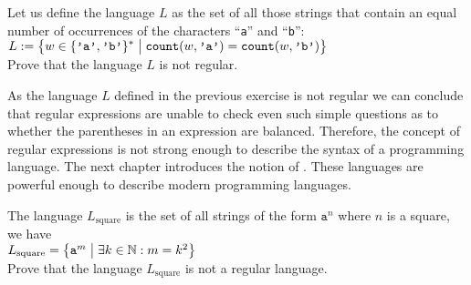 \exerciseEng
Let us define the language $L$ as the set of all those strings that contain an equal number of 
occurrences of the characters ``\texttt{a}'' and  ``\texttt{b}'':
\\[0.2cm]
\hspace*{1.3cm}
$\displaystyle L := \bigl\{ w \in \{\texttt{'a'}, \texttt{'b'}\}^* \bigm| \texttt{count}(w, \texttt{'a'})=\texttt{count}(w, \texttt{'b'}) \bigr\}$
\\[0.2cm]
Prove that the language $L$ is not regular. \eox

\remarkEng
As the language $L$ defined in the previous exercise is not regular we can conclude that regular expressions
are unable to check even such simple questions as to whether the parentheses in an expression are balanced.
Therefore, the concept of regular expressions is not strong enough to describe the syntax of a programming language.
The next chapter introduces the notion of .  These languages
are powerful enough to describe modern programming languages. 

\exerciseEng
The language  $L_{\mathrm{square}}$ is the set of all strings of the form $\mathtt{a}^n$ where $n$
is a square, we have
\\[0.2cm]
\hspace*{1.3cm}
$L_{\mathrm{square}} = \bigl\{ \mathtt{a}^{m} \bigm| \exists k \in \mathbb{N}: m = k^2 \bigr\}$
\\[0.2cm]
Prove that the language  $L_{\mathrm{square}}$ is not a regular language.
\eox
\vspace*{0.1cm}

